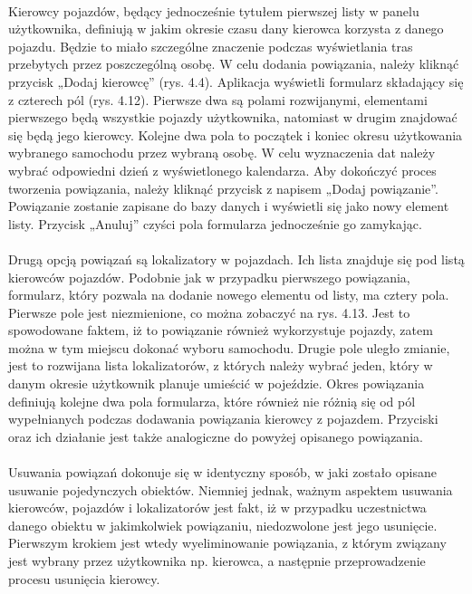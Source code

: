\paragraph{}
Kierowcy pojazdów, będący jednocześnie tytułem pierwszej listy w panelu użytkownika, definiują w jakim okresie czasu dany kierowca korzysta z danego pojazdu. Będzie to miało szczególne znaczenie podczas wyświetlania tras przebytych przez poszczególną osobę. W celu dodania powiązania, należy kliknąć przycisk „Dodaj kierowcę” (rys. 4.4). Aplikacja wyświetli formularz składający się z czterech pól (rys. 4.12). Pierwsze dwa są polami rozwijanymi, elementami pierwszego będą wszystkie pojazdy użytkownika, natomiast w drugim znajdować się będą jego kierowcy. Kolejne dwa pola to początek i koniec okresu użytkowania wybranego samochodu przez wybraną osobę. W celu wyznaczenia dat należy wybrać odpowiedni dzień z wyświetlonego kalendarza. Aby dokończyć proces tworzenia powiązania, należy kliknąć przycisk z napisem „Dodaj powiązanie”. Powiązanie zostanie zapisane do bazy danych i wyświetli się jako nowy element listy. Przycisk „Anuluj” czyści pola formularza jednocześnie go zamykając.

\paragraph{}
Drugą opcją powiązań są lokalizatory w pojazdach. Ich lista znajduje się pod listą kierowców pojazdów. Podobnie jak w przypadku pierwszego powiązania, formularz, który pozwala na dodanie nowego elementu od listy, ma cztery pola. Pierwsze pole jest niezmienione, co można zobaczyć na rys. 4.13. Jest to spowodowane faktem, iż to powiązanie również wykorzystuje pojazdy, zatem można w tym miejscu dokonać wyboru samochodu. Drugie pole uległo zmianie, jest to rozwijana lista lokalizatorów, z których należy wybrać jeden, który w danym okresie użytkownik planuje umieścić w pojeździe. Okres powiązania definiują kolejne dwa pola formularza, które również nie różnią się od pól wypełnianych podczas dodawania powiązania kierowcy z pojazdem. Przyciski oraz ich działanie jest także analogiczne do powyżej opisanego powiązania.

\paragraph{}
Usuwania powiązań dokonuje się w identyczny sposób, w jaki zostało opisane usuwanie pojedynczych obiektów. Niemniej jednak, ważnym aspektem usuwania kierowców, pojazdów i lokalizatorów jest fakt, iż w przypadku uczestnictwa danego obiektu w jakimkolwiek powiązaniu, niedozwolone jest jego usunięcie. Pierwszym krokiem jest wtedy wyeliminowanie powiązania, z którym związany jest wybrany przez użytkownika np. kierowca, a następnie przeprowadzenie procesu usunięcia kierowcy.

